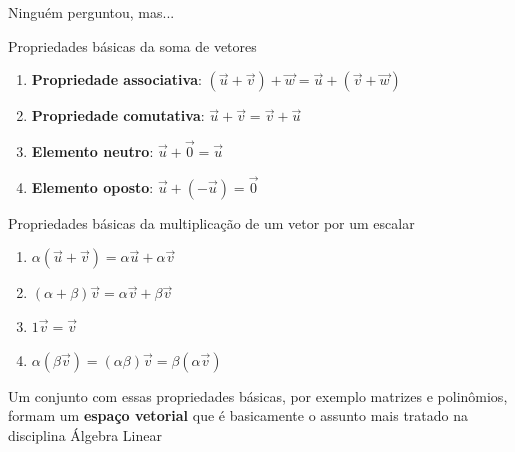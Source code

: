 \begin{frame}{Ninguém perguntou, mas...}
    \begin{tcolorbox}[colback=red!10]
        Propriedades básicas da soma de vetores
        \begin{enumerate}
            \item \textbf{Propriedade associativa}:
                \((\vec{u}+\vec{v})+\vec{w}=\vec{u}+(\vec{v}+\vec{w})\)
            \item \textbf{Propriedade comutativa}: \(\vec{u}+\vec{v}=\vec{v}+\vec{u}\)
            \item \textbf{Elemento neutro}: \(\vec{u}+\vec{0}=\vec{u}\)
            \item \textbf{Elemento oposto}: \(\vec{u}+(-\vec{u})=\vec{0}\)
        \end{enumerate}
    \end{tcolorbox}
    \begin{tcolorbox}[colback=blue!10]
        Propriedades básicas da multiplicação de um vetor por um escalar
        \begin{enumerate}
            \item \(\alpha(\vec{u}+\vec{v})=\alpha\vec{u}+\alpha\vec{v}\)
            \item \((\alpha+\beta)\vec{v}=\alpha\vec{v}+\beta\vec{v}\)
            \item \(1\vec{v}=\vec{v}\)
            \item \(\alpha(\beta\vec{v})=(\alpha\beta)\vec{v}=\beta(\alpha\vec{v})\)
        \end{enumerate}
    \end{tcolorbox}
    Um conjunto com essas propriedades básicas, por exemplo matrizes e polinômios, formam um \textbf{espaço vetorial} que é
    basicamente o assunto mais tratado na disciplina Álgebra Linear
\end{frame}

